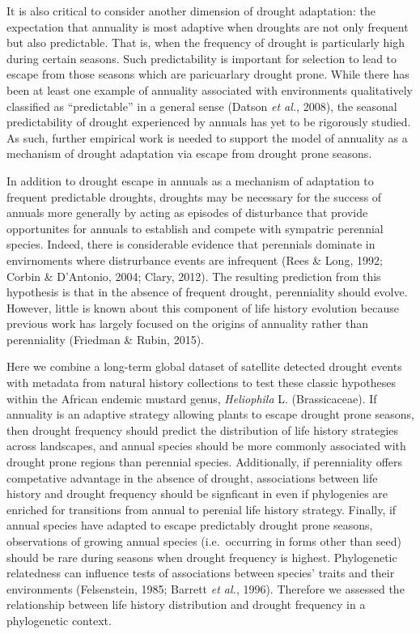 \documentclass[man,floatsintext]{apa6}
\theoremstyle{definition}
\theoremstyle{definition}
\theoremstyle{definition}
\theoremstyle{remark}
\begin{document}
It is also critical to consider another dimension of drought adaptation:
the expectation that annuality is most adaptive when droughts are not
only frequent but also predictable. That is, when the frequency of
drought is particularly high during certain seasons. Such predictability
is important for selection to lead to escape from those seasons which
are paricuarlary drought prone. While there has been at least one
example of annuality associated with environments qualitatively
classified as \enquote{predictable} in a general sense (Datson \emph{et
al.}, 2008), the seasonal predictability of drought experienced by
annuals has yet to be rigorously studied. As such, further empirical
work is needed to support the model of annuality as a mechanism of
drought adaptation via escape from drought prone seasons.

In addition to drought escape in annuals as a mechanism of adaptation to
frequent predictable droughts, droughts may be necessary for the success
of annuals more generally by acting as episodes of disturbance that
provide opportunites for annuals to establish and compete with sympatric
perennial species. Indeed, there is considerable evidence that
perennials dominate in envirnoments where distrurbance events are
infrequent (Rees \& Long, 1992; Corbin \& D'Antonio, 2004; Clary, 2012).
The resulting prediction from this hypothesis is that in the absence of
frequent drought, perenniality should evolve. However, little is known
about this component of life history evolution because previous work has
largely focused on the origins of annuality rather than perenniality
(Friedman \& Rubin, 2015).

Here we combine a long-term global dataset of satellite detected drought
events with metadata from natural history collections to test these
classic hypotheses within the African endemic mustard genus,
\emph{Heliophila} L. (Brassicaceae). If annuality is an adaptive
strategy allowing plants to escape drought prone seasons, then drought
frequency should predict the distribution of life history strategies
across landscapes, and annual species should be more commonly associated
with drought prone regions than perennial species. Additionally, if
perenniality offers competative advantage in the absence of drought,
associations between life history and drought frequency should be
signficant in even if phylogenies are enriched for transitions from
annual to perenial life history strategy. Finally, if annual species
have adapted to escape predictably drought prone seasons, observations
of growing annual species (i.e.~occurring in forms other than seed)
should be rare during seasons when drought frequency is highest.
Phylogenetic relatedness can influence tests of associations between
species' traits and their environments (Felsenstein, 1985; Barrett
\emph{et al.}, 1996). Therefore we assessed the relationship between
life history distribution and drought frequency in a phylogenetic
context.
\end{document}
